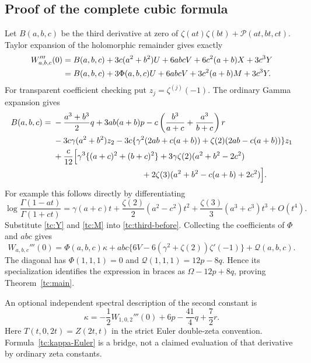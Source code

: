 \documentclass[11pt,a4paper]{article}
\numberwithin{equation}{section}
\theoremstyle{plain}
\theoremstyle{definition}
\theoremstyle{remark}
\begin{document}
\subsection{Proof of the complete cubic formula}

Let $B(a,b,c)$ be the third derivative at zero of
$\zeta(at)\zeta(bt)+\mathscr P(at,bt,ct)$.  Taylor expansion of
the holomorphic remainder gives exactly
\begin{align}
 W_{a,b,c}'''(0)
 &=B(a,b,c)+3c(a^2+b^2)U+6abcV
                  +6c^2(a+b)X+3c^3Y\notag\\
 &=B(a,b,c)+3\Phi(a,b,c)U+6abcV
                  +3c^2(a+b)M+3c^3Y.
 \label{tc:third-before}
\end{align}
For transparent coefficient checking put $z_j=\zeta^{(j)}(-1)$.
The ordinary Gamma expansion gives
\begin{align*}
 B(a,b,c)={}&-\frac{a^3+b^3}{2}q+3ab(a+b)p
       -c\left(\frac{b^3}{a+c}+\frac{a^3}{b+c}\right)r\\
 &-3c\gamma(a^2+b^2)z_2
       -3c\{\gamma^2(2ab+c(a+b))
                         +\zeta(2)(2ab-c(a+b))\}z_1\\
 &+\frac c{12}\Bigl[
       \gamma^3\{(a+c)^2+(b+c)^2\}
       +3\gamma\zeta(2)(a^2+b^2-2c^2)\\
 &\hspace{38mm}+2\zeta(3)(a^2+b^2-c(a+b)+2c^2)\Bigr].
\end{align*}
For example this follows directly by differentiating
\[
 \log\frac{\Gamma(1-at)}{\Gamma(1+ct)}
  =\gamma(a+c)t+\frac{\zeta(2)}2(a^2-c^2)t^2
                    +\frac{\zeta(3)}3(a^3+c^3)t^3+O(t^4).
\]
Substitute \eqref{tc:Y} and \eqref{tc:M} into
\eqref{tc:third-before}.  Collecting the coefficients of
$\Phi$ and $abc$ gives
\begin{equation}
 W_{a,b,c}'''(0)
 =\Phi(a,b,c)\kappa
   +abc\{6V-6(\gamma^2+\zeta(2))\zeta'(-1)\}
   +\mathscr Q(a,b,c).
 \label{tc:third-two}
\end{equation}
The diagonal has $\Phi(1,1,1)=0$ and
$\mathscr Q(1,1,1)=12p-8q$.  Hence its specialization identifies
the expression in braces as $\Omega-12p+8q$, proving
Theorem~\ref{tc:main}.

An optional independent spectral description of the second constant is
\begin{equation}
 \kappa=-\frac12W_{1,0,2}'''(0)
                +6p-\frac{41}{4}q+\frac72r.
 \label{tc:kappa-Euler}
\end{equation}
Here $T(t,0,2t)=Z(2t,t)$ in the strict Euler double-zeta convention.
Formula~\eqref{tc:kappa-Euler} is a bridge, not a claimed evaluation
of that derivative by ordinary zeta constants.
\end{document}
